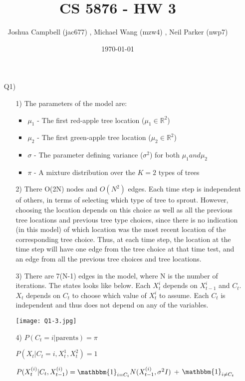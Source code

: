 \documentclass[12pt]{article}
\title{CS 5876 - HW 3}
\author{Joshua Campbell (jac677) , Michael Wang (mzw4) , Neil Parker (nwp7) }
\date{\today}
\begin{document}
\maketitle

\begin{enumerate}

\item[Q1)]
	
	\begin{enumerate}
	\item[1)] The parameters of the model are:
		\begin{itemize}
		\item $\mu_1$ - The first red-apple tree location ($ \mu_1 \in \mathbb{R}^2 $)
		\item $\mu_2$ - The first green-apple tree location ($ \mu_2 \in \mathbb{R}^2 $)
		\item $\sigma$ - The parameter defining variance ($ \sigma^2 $) for both $ \mu_1 and \mu_2 $
		\item $\pi$ - A mixture distribution over the $ K=2 $ types of trees
		\end{itemize}
	
	\item[2)] There O(2N) nodes and $O(N^2)$ edges. Each time step is independent of others, in terms of selecting which type of tree to sprout. However, choosing the location depends on this choice as well as all the previous tree locations and previous tree type choices, since there is no indication (in this model) of which location was the most recent location of the corresponding tree choice. Thus, at each time step, the location at the time step will have one edge from the tree choice at that time test, and an edge from all the previous tree choices and tree locations.
	
	\item[3)] There are 7(N-1) edges in the model, where N is the number of iterations. The states looks like below. Each $X_t^i$ depends on $X_{t-1}^i$ and $C_t$. $X_t$ depends on $C_t$ to choose which value of $X_t^i$ to assume. Each $C_t$ is independent and thus does not depend on any of the variables.
		
	\texttt{[image: Q1-3.jpg]}
	
	\item[4)] $P(C_t = i | \text{parents}) = \pi$
	
	$P(X_t | C_t = i, X^1_{t}, X^2_{t}) = 1$
	
	$P(X^{(i)}_t | C_t, X^{(i)}_{t-1}) = \mathbbm{1}_{ i = C_t }N(X^{(i)}_{t-1}, \sigma^2 I)$ + $\mathbbm{1}_{ i \neq C_t} $
	

\end{enumerate}
\end{enumerate}
\end{document}
